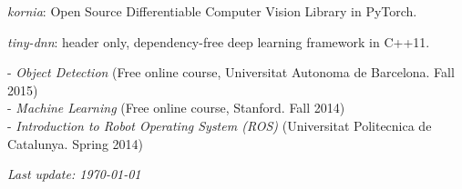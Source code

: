 \documentclass{article}
\begin{document}
\begin{llist}
{\em kornia}: Open Source Differentiable Computer Vision Library in PyTorch.

{\em tiny-dnn}: header only, dependency-free deep learning framework in C++11.


%



\label{Relevant Coursework}
- \textit{Object Detection} (Free online course, Universitat Autonoma de Barcelona. Fall 2015)\\
- \textit{Machine Learning} (Free online course, Stanford. Fall 2014)\\
- \textit{Introduction to Robot Operating System (ROS)} (Universitat Politecnica de Catalunya. Spring 2014)

\label{Reference}


\end{llist}

{\em Last update: \today}
\end{document}
